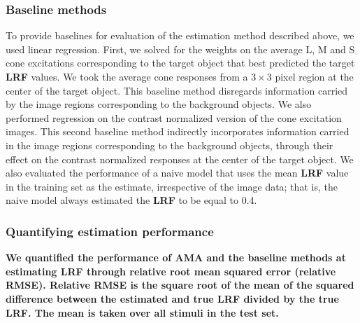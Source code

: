\documentclass{jov}
\providecommand{\DIFaddtex}[1]{{\bf #1}} %
\providecommand{\DIFdeltex}[1]{} %
\providecommand{\DIFaddbegin}{} %
\providecommand{\DIFaddend}{} %
\providecommand{\DIFdelbegin}{} %
\providecommand{\DIFdelend}{} %
\providecommand{\DIFadd}[1]{\texorpdfstring{\DIFaddtex{#1}}{#1}} %
\providecommand{\DIFdel}[1]{\texorpdfstring{\DIFdeltex{#1}}{}} %
\newcommand{\DIFscaledelfig}{0.5}
\newlength{\DIFdelgraphicswidth} %
\newlength{\DIFdelgraphicsheight} %
\newcommand{\DIFaddincludegraphics}[2][]{{\color{blue}\fbox{\DIFOincludegraphics[#1]{#2}}}} %
\newcommand{\DIFdelincludegraphics}[2][]{%
\sbox{\DIFdelgraphicsbox}{\DIFOincludegraphics[#1]{#2}}%
\settoboxwidth{\DIFdelgraphicswidth}{\DIFdelgraphicsbox} %
\settoboxtotalheight{\DIFdelgraphicsheight}{\DIFdelgraphicsbox} %
\scalebox{\DIFscaledelfig}{%
\parbox[b]{\DIFdelgraphicswidth}{\usebox{\DIFdelgraphicsbox}\\[-\baselineskip] \rule{\DIFdelgraphicswidth}{0em}}\llap{\resizebox{\DIFdelgraphicswidth}{\DIFdelgraphicsheight}{%
\setlength{\unitlength}{\DIFdelgraphicswidth}%
\begin{picture}(1,1)%
\thicklines\linethickness{2pt} %
{\color[rgb]{1,0,0}\put(0,0){\framebox(1,1){}}}%
{\color[rgb]{1,0,0}\put(0,0){\line( 1,1){1}}}%
{\color[rgb]{1,0,0}\put(0,1){\line(1,-1){1}}}%
\end{picture}%
}\hspace*{3pt}}} %
} %
\DeclareRobustCommand{\DIFaddbegin}{\DIFOaddbegin \let\includegraphics\DIFaddincludegraphics} %
\DeclareRobustCommand{\DIFaddend}{\DIFOaddend \let\includegraphics\DIFOincludegraphics} %
\DeclareRobustCommand{\DIFdelbegin}{\DIFOdelbegin \let\includegraphics\DIFdelincludegraphics} %
\DeclareRobustCommand{\DIFdelend}{\DIFOaddend \let\includegraphics\DIFOincludegraphics} %
\begin{document}
\subsubsection*{Baseline methods}
To provide baselines for evaluation of the estimation method described above, we used linear regression.
First, we solved for the weights on the average L, M and S cone excitations corresponding to the target object that best predicted the target \DIFdelbegin \DIFdel{LRV }\DIFdelend \DIFaddbegin \DIFadd{LRF }\DIFaddend values.
We took the average cone responses from a $3 \times 3$ pixel region at the center of the target object.
This baseline method disregards information carried by the image regions corresponding to the background objects.
We also performed regression on the contrast normalized version of the cone excitation images.
This second baseline method indirectly incorporates information carried in the image regions corresponding to the background objects,
through their effect on the contrast normalized responses at the center of the target object. 
We also evaluated the performance of a naive model that uses the mean \DIFdelbegin \DIFdel{LRV }\DIFdelend \DIFaddbegin \DIFadd{LRF }\DIFaddend value in the training set as the estimate, irrespective
of the image data; that is, the naive model always estimated the \DIFdelbegin \DIFdel{LRV }\DIFdelend \DIFaddbegin \DIFadd{LRF }\DIFaddend to be equal to 0.4.

\DIFaddbegin \subsubsection*{\DIFadd{Quantifying estimation performance}}
\DIFadd{We quantified the performance of AMA and the baseline methods at estimating LRF through relative root mean squared error (relative RMSE). Relative RMSE is the square root of the mean of the squared difference between the estimated and true LRF divided by the true LRF. The mean is taken over all stimuli in the test set. 
}
\end{document}
